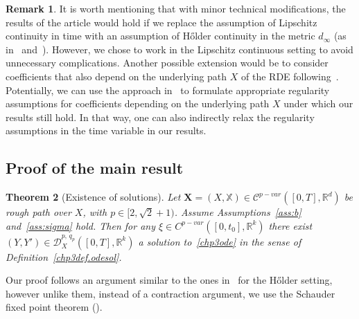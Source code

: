 \documentclass[10pt]{amsart}
\newtheorem{theo}{Theorem}[section]
\theoremstyle{definition}\newtheorem{defi}[theo]{Definition}\newtheorem{rema}[theo]{Remark}\newtheorem{exam}[theo]{Example}\newtheorem{exem}[theo]{Example}\newtheorem{nota}[theo]{Notation}
\newcommand{\scrD}{\mathscr{D}}
\newcommand{\bbX}{\mathbb{X}}
\newcommand{\calC}{\mathcal{C}}
\newcommand{\Rr}{{\mathbb{R}}}
\begin{document}
\begin{rema}\label{rem:timeholder}
It is worth mentioning that with minor technical modifications, the results of the article would hold if we replace the assumption of Lipschitz continuity in time with an assumption of H\H older continuity in the metric $d_{\infty}$ (as in~\cite{ContKalinin} and~\cite{Kalinin}). However, we chose to work in the Lipschitz continuous setting to avoid unnecessary complications. Another possible extension would be to consider coefficients that also depend on the underlying path $X$ of the RDE following~\cite{KellerZhang}. Potentially, we can use the approach in~\cite{KellerZhang} to formulate appropriate regularity assumptions for coefficients depending on the underlying path $X$ under which our results still hold. In that way, one can also indirectly relax the regularity assumptions in the time variable in our results.
\end{rema}

\subsection{Proof of the main result}


\begin{theo}[Existence of solutions]\label{chp3theorem:existence}
Let $\bm{X}=(X, \bbX)\in \calC^{p-var}([0,T],\Rr^d)$ be rough path over $X$, with $p\in [2, \sqrt{2}+1)$. Assume Assumptions~\ref{ass:b} and~\ref{ass:sigma} hold. Then for any $\xi\in C^{p-var}([0,t_0],\Rr^k)$ there exist $(Y,Y')\in\scrD^{p,\,q_p}_{X }([0,T],\Rr^k)$ a solution to~\eqref{chp3ode} in the sense of Definition~\ref{chp3def.odesol}.
\end{theo}


Our proof follows an argument similar to the ones in~\cite{frizhairer} for the H\H older setting, however unlike them, instead of a contraction argument, we use the Schauder fixed point theorem (\cite[Theorem~11.1]{GilbTrud}).
\end{document}

